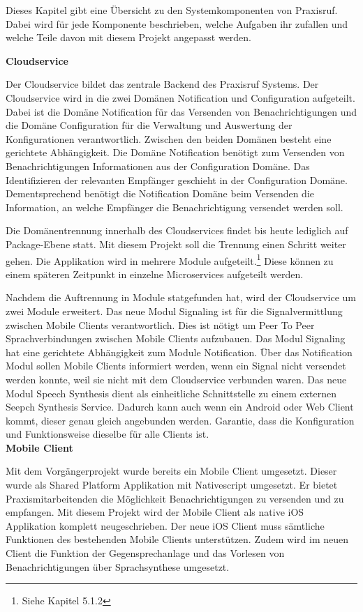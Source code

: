 Dieses Kapitel gibt eine Übersicht zu den Systemkomponenten von Praxisruf.
Dabei wird für jede Komponente beschrieben, welche Aufgaben ihr zufallen und welche Teile davon mit diesem Projekt angepasst werden.

\textbf{Cloudservice}

Der Cloudservice bildet das zentrale Backend des Praxisruf Systems.
Der Cloudservice wird in die zwei Domänen Notification und Configuration aufgeteilt.
Dabei ist die Domäne Notification für das Versenden von Benachrichtigungen und die Domäne Configuration für die Verwaltung und Auswertung der Konfigurationen verantwortlich.
Zwischen den beiden Domänen besteht eine gerichtete Abhängigkeit.
Die Domäne Notification benötigt zum Versenden von Benachrichtigungen Informationen aus der Configuration Domäne.
Das Identifizieren der relevanten Empfänger geschieht in der Configuration Domäne.
Dementsprechend benötigt die Notification Domäne beim Versenden die Information, an welche Empfänger die Benachrichtigung versendet werden soll.

Die Domänentrennung innerhalb des Cloudservices findet bis heute lediglich auf Package-Ebene statt.
Mit diesem Projekt soll die Trennung einen Schritt weiter gehen.
Die Applikation wird in mehrere Module aufgeteilt.\footnote{Siehe Kapitel 5.1.2}
Diese können zu einem späteren Zeitpunkt in einzelne Microservices aufgeteilt werden.

Nachdem die Auftrennung in Module statgefunden hat, wird der Cloudservice um zwei Module erweitert.
Das neue Modul Signaling ist für die Signalvermittlung zwischen Mobile Clients verantwortlich.
Dies ist nötigt um Peer To Peer Sprachverbindungen zwischen Mobile Clients aufzubauen.
Das Modul Signaling hat eine gerichtete Abhängigkeit zum Module Notification.
Über das Notification Modul sollen Mobile Clients informiert werden, wenn ein Signal nicht versendet werden konnte, weil sie nicht mit dem Cloudservice verbunden waren.
Das neue Modul Speech Synthesis dient als einheitliche Schnittstelle zu einem externen Seepch Synthesis Service.
Dadurch kann auch wenn ein Android oder Web Client kommt, dieser genau gleich angebunden werden.
Garantie, dass die Konfiguration und Funktionsweise dieselbe für alle Clients ist. \\

\textbf{Mobile Client}

Mit dem Vorgängerprojekt wurde bereits ein Mobile Client umgesetzt.
Dieser wurde als Shared Platform Applikation mit Nativescript umgesetzt.
Er bietet Praxismitarbeitenden die Möglichkeit Benachrichtigungen zu versenden und zu empfangen.
Mit diesem Projekt wird der Mobile Client als native iOS Applikation komplett neugeschrieben.
Der neue iOS Client muss sämtliche Funktionen des bestehenden Mobile Clients unterstützen.
Zudem wird im neuen Client die Funktion der Gegensprechanlage und das Vorlesen von Benachrichtigungen über Sprachsynthese umgesetzt.

